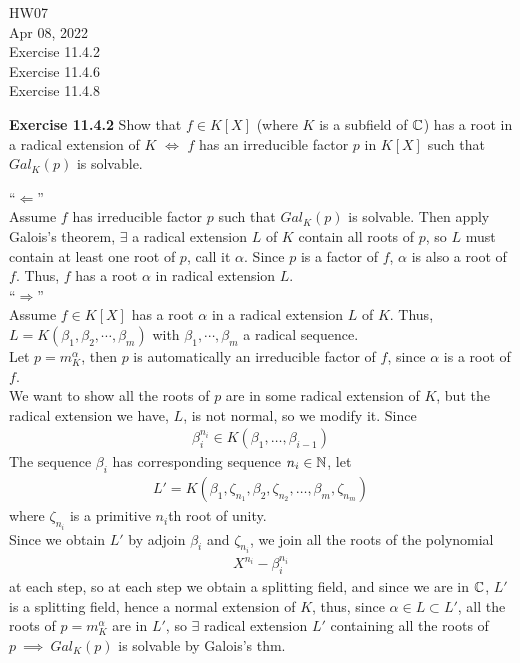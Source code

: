 \documentclass{article}
\begin{document}
\maketitle
HW07 \\
Apr 08, 2022 \\
Exercise 11.4.2\\
Exercise 11.4.6\\
Exercise 11.4.8\\
\pagebreak

\begin{homeworkProblem}
    \textbf{Exercise 11.4.2} Show that $f \in K[X]$ (where $K$ is a subfield of $\mathbb{C}$) has a root
    in a radical extension of $K$ $\iff$ $f$ has an irreducible factor $p$ in $K[X]$ 
    such that $Gal_K(p)$ is solvable.\\
    \solution 

    ``$\Leftarrow$''\\
    Assume $f$ has irreducible factor $p$ such that $Gal_K(p)$ is solvable. Then apply
    Galois's theorem, $\exists$ a radical extension $L$ of $K$ contain all roots 
    of $p$, so $L$ must contain at least one root of $p$, call it $\alpha$.
    Since $p$ is a factor of $f$, $\alpha$ is also a root of $f$.
    Thus, $f$ has a root $\alpha$ in radical extension $L$.\\
    ``$\Rightarrow$''\\
    Assume $f\in K[X]$ has a root $\alpha$ in a radical extension $L$ of $K$.
    Thus, $L = K(\beta_1,\beta_2, \cdots, \beta_m)$ with $\beta_1, \cdots, \beta_m$
    a radical sequence.\\
    Let $p = m_K^{\alpha}$, then $p$ is automatically an irreducible factor of $f$,
    since $\alpha$ is a root of $f$.\\
    We want to show all the roots of $p$ are in some radical extension of $K$,
    but the radical extension we have, $L$, is not normal, so we modify it.
    Since 
    \begin{align}
        \beta_i^{n_i} \in K(\beta_1, \ldots, \beta_{i-1})
    \end{align}
    The sequence $\beta_i$ has corresponding sequence $n_i \in \mathbb{N}$, let
    \begin{align}
        L' = K(\beta_1, \zeta_{n_1}, \beta_2, \zeta_{n_2}, \ldots, \beta_m, \zeta_{n_m}) 
    \end{align}
    where $\zeta_{n_i}$ is a primitive $n_i$th root of unity.\\
    Since we obtain $L'$ by adjoin $\beta_i$ and $\zeta_{n_i}$,
    we join all the roots of the polynomial 
    \begin{align}
        X^{n_i} - \beta_i^{n_i}
    \end{align}
    at each step, so at each step we obtain a splitting field,
    and since we are in $\mathbb{C}$, $L'$ is a splitting field, 
    hence a normal extension of $K$, thus, since $\alpha \in L \subset L'$,
    all the roots of $p = m_K^{\alpha}$ are in $L'$, so
    $\exists$ radical extension $L'$
    containing all the roots of $p \ \implies \ Gal_K(p)$ is solvable by Galois's thm.\\


\end{homeworkProblem}
\end{document}
